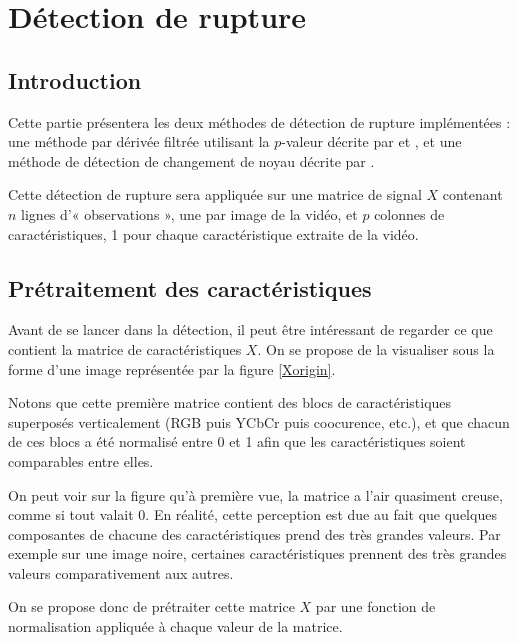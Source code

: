 \chapter{Détection de rupture}

\section{Introduction}

Cette partie présentera les deux méthodes de détection de rupture implémentées : une méthode par dérivée filtrée utilisant la $p$-valeur décrite par \cite{Bertrand11} et \cite{Herault14}, et une méthode de détection de changement de noyau décrite par \cite{Desobry05}.

Cette détection de rupture sera appliquée sur une matrice de signal $X$ contenant $n$ lignes d'« observations », une par image de la vidéo, et $p$ colonnes de caractéristiques, 1 pour chaque caractéristique extraite de la vidéo.


\section{Prétraitement des caractéristiques}

Avant de se lancer dans la détection, il peut être intéressant de regarder ce que contient la matrice de caractéristiques $X$. On se propose de la visualiser sous la forme d'une image représentée par la figure \ref{Xorigin}.

Notons que cette première matrice contient des blocs de caractéristiques superposés verticalement (RGB puis YCbCr puis coocurence, etc.), et que chacun de ces blocs a été normalisé entre 0 et 1 afin que les caractéristiques soient comparables entre elles.

On peut voir sur la figure qu'à première vue, la matrice a l'air quasiment creuse, comme si tout valait $0$. En réalité, cette perception est due au fait que quelques composantes de chacune des caractéristiques prend des très grandes valeurs. Par exemple sur une image noire, certaines caractéristiques prennent des très grandes valeurs comparativement aux autres.

On se propose donc de prétraiter cette matrice $X$ par une fonction de normalisation appliquée à chaque valeur de la matrice. 

